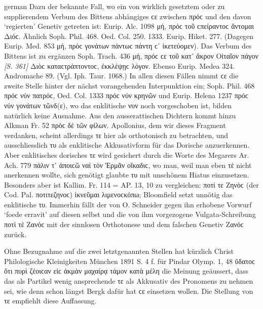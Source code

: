 \begin{otherlanguage*}{german}
Dazu der bekannte Fall, wo ein von wirklich gesetztem oder zu supplierendem Verbum des Bittens abhängiges ϲε zwischen πρόϲ und den davon ‘regierten’ Genetiv getreten ist: Eurip. Alc. 1098 μή, πρόϲ  τοῦ ϲπείραντοϲ ἄντομαι Διόϲ. Ähnlich Soph. Phil. 468. Oed. Col. 250. 1333. Eurip. Hiket. 277. (Dagegen Eurip. Med. 853 μή, πρὸϲ γονάτων  πάντωϲ πάντη ϲ᾽ ἱκετεύομεν). Das Verbum des Bittens ist zu ergänzen Soph. Trach. 436 μή, πρόϲ ϲε τοῦ κατ᾽ ἄκρον Οἰταῖον πάγον \hypertarget{p361}{\emph{[S. 361]}}\label{p361} Διὸϲ καταϲτράπτοντοϲ, ἐκκλέψῃϲ λόγον. Ebenso Eurip. Medea 324. Andromache 89. (Vgl. Iph. Taur. 1068.) In allen diesen Fällen nimmt ϲε die zweite Stelle hinter der nächst vorangehenden Interpunktion ein; Soph. Phil. 468 πρόϲ νύν  πατρόϲ, Oed. Col. 1333 πρόϲ νύν  κρηνῶν und Eurip. Helena 1237 πρόϲ νύν  γονάτων τῶνδ(ε), wo das enklitische νυν noch vorgeschoben ist, bilden natürlich keine Ausnahme. Aus den ausserattischen Dichtern kommt hinzu Alkman Fr. 52 πρὸϲ δέ  τῶν φίλων. Apollonius, dem wir dieses Fragment verdanken, scheint allerdings τε hier als orthotonisch zu betrachten, und ausschliesslich τυ als enklitische Akkusativform für das Dorische anzuerkennen. Aber enklitisches dorisches τε wird gesichert durch die Worte des Megarers Ar. Ach. 779 πάλιν τ᾽ ἀποιϲῶ ναὶ τὸν Ἑρμᾶν οἴκαδιϲ, wo man, weil man eben τὲ nicht anerkennen wollte, sich genötigt glaubte τυ mit unschönem Hiatus einzusetzen. Besonders aber ist Kallim. Fr. 114 = AP. 13, 10 zu vergleichen: ποτί τε Ζηνὸϲ (der Cod. Pal. ποτιτεζηνοϲ) ἱκνεῦμαι λιμενοϲκόπω; Bloomfield setzt unnötig das enklitische τυ. Immerhin fällt der von O. Schneider gegen ihn erhobene Vorwurf ‘foede erravit’ auf diesen selbst und die von ihm vorgezogene Vulgata-Schreibung ποτὶ τὲ Ζανὸϲ mit der sinnlosen Orthotonese und dem falschen Genetiv Ζανόϲ zurück.

Ohne Bezugnahme auf die zwei letztgenannten Stellen hat kürzlich Christ Philologische Kleinigkeiten München 1891 S. 4 f. für Pindar Olymp. 1, 48 ὕδατοϲ ὅτι  πυρὶ ζέοιϲαν εἰϲ ἀκμὰν μαχαίρᾳ τάμον κατὰ μέλη die Meinung geäussert, dass das als Partikel wenig ansprechende τε als Akkusativ des Pronomens zu nehmen sei, wie denn schon längst Bergk dafür hat ϲε einsetzen wollen. Die Stellung von τε empfiehlt diese Auffassung.


\end{otherlanguage*}
